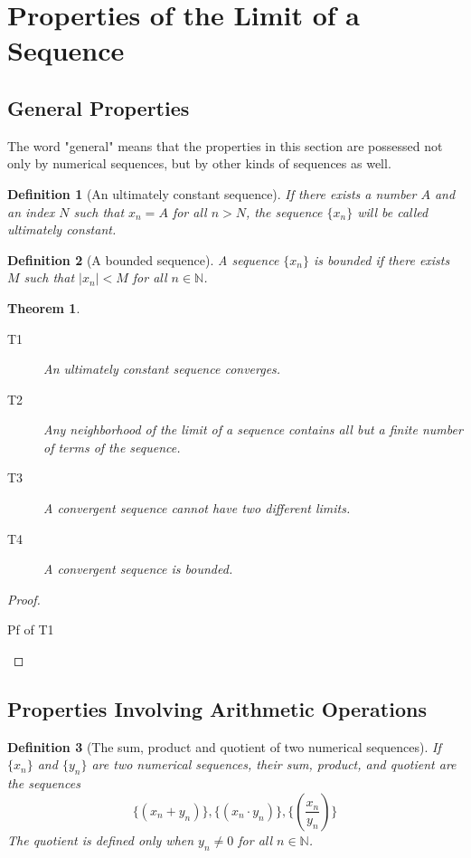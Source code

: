 \documentclass[onecolumn]{ctexart}
\newtheorem{definition}{Definition}
\newtheorem{theorem}{Theorem}
\begin{document}
\section{Properties of the Limit of a Sequence}

\subsection{General Properties}

The word "general" means that the properties in this section are possessed not 
only by numerical sequences, but by other kinds of sequences as well.

\begin{definition}[An ultimately constant sequence]
  If there exists a number $A$ and an index $N$ such that $x_n = A$ for all $n > 
  N$, the sequence $\lbrace x_n \rbrace$ will be called ultimately constant.
\end{definition}

\begin{definition}[A bounded sequence]
  A sequence $\lbrace x_n \rbrace$ is bounded if there exists $M$ such that 
  $|x_n| < M$ for all $n \in \mathbb{N}$.
\end{definition}

\begin{theorem}
  \begin{description}
    \item[T1] An ultimately constant sequence converges.
    \item[T2] Any neighborhood of the limit of a sequence contains all but a 
    finite number of terms of the sequence.
    \item[T3] A convergent sequence cannot have two different limits.
    \item[T4] A convergent sequence is bounded.
  \end{description}
\end{theorem}
\begin{proof}
  \begin{description}
    \item[Pf of T1] 
  \end{description}
\end{proof}

\subsection{Properties Involving Arithmetic Operations}

\begin{definition}[The sum, product and quotient of two numerical sequences]
  If $\lbrace x_n \rbrace$ and $\lbrace y_n \rbrace$ are two numerical sequences, 
  their sum, product, and quotient are the sequences
  \[
    \lbrace (x_n + y_n) \rbrace, \lbrace (x_n \cdot y_n) \rbrace, \lbrace (\frac{x_n}{y_n}) \rbrace
  \]
  The quotient is defined only when $y_n \neq 0$ for all $n \in \mathbb{N}$.
\end{definition}
\end{document}

